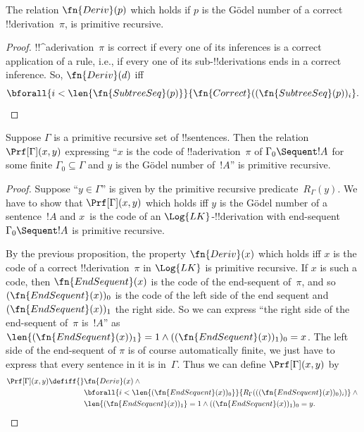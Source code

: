 \documentclass[../../../include/open-logic-section]{subfiles}
\begin{document}
\begin{prop}
  The relation $\fn{Deriv}(p)$ which holds if $p$ is the G\"odel
  number of a correct !!{derivation}~$\pi$, is primitive recursive.
\end{prop}

\begin{proof}
  !!^a{derivation}~$\pi$ is correct if every one of its inferences
  is a correct application of a rule, i.e., if every one of its
  sub-!!{derivation}s ends in a correct inference. So, $\fn{Deriv}(d)$
  iff
  \[
  \bforall{i<\len{\fn{SubtreeSeq}(p)}}{\fn{Correct}((\fn{SubtreeSeq}(p))_i}.
  \]
\end{proof}


\begin{prop}
Suppose $\Gamma$ is a primitive recursive set of !!{sentence}s.  Then
the relation $\Prf[\Gamma](x, y)$ expressing ``$x$ is the code of
!!a{derivation}~$\pi$ of $\Gamma_0 \Sequent !A$ for some finite
$\Gamma_0 \subseteq \Gamma$ and $y$ is the G\"odel number of~$!A$'' is
primitive recursive.
\end{prop}

\begin{proof}
Suppose ``$y \in \Gamma$'' is given by the primitive recursive
predicate~$R_\Gamma(y)$.  We have to show that $\Prf[\Gamma](x, y)$
which holds iff $y$ is the G\"odel number of a sentence~$!A$ and
$x$~is the code of an $\Log{LK}$-!!{derivation} with end-sequent
$\Gamma_0 \Sequent !A$ is primitive recursive.

By the previous proposition, the property $\fn{Deriv}(x)$ which holds
iff $x$ is the code of a correct !!{derivation}~$\pi$ in $\Log{LK}$ is
primitive recursive.  If $x$ is such a code, then $\fn{EndSequent}(x)$
is the code of the end-sequent of~$\pi$, and so
$(\fn{EndSequent}(x))_0$ is the code of the left side of the end
sequent and $(\fn{EndSequent}(x))_1$ the right side.  So we can
express ``the right side of the end-sequent of~$\pi$ is~$!A$'' as
$\len{(\fn{EndSequent}(x))_1} = 1 \land ((\fn{EndSequent}(x))_1)_0 =
x$.  The left side of the end-sequent of $\pi$ is of course
automatically finite, we just have to express that every sentence in
it is in~$\Gamma$.  Thus we can define $\Prf[\Gamma](x, y)$ by
\begin{align*}
\Prf[\Gamma](x, y) \defiff {}&
\fn{Deriv}(x) \land {} \\
& \bforall{i <
  \len{(\fn{EndSequent}(x))_0}}{R_\Gamma(((\fn{EndSequent}(x))_0)_i)} \land {}\\
& \len{(\fn{EndSequent}(x))_1} = 1 \land ((\fn{EndSequent}(x))_1)_0 = y.
\end{align*}
\end{proof}
\end{document}

